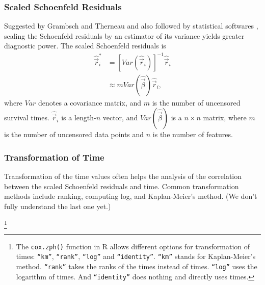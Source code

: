 \subsubsection{Scaled Schoenfeld Residuals}\label{cox:scaled-residual}
Suggested by Grambsch and Therneau \cite{grambsch1994proportional} and also
followed by statistical softwares \cite{testph}, scaling the Schoenfeld
residuals by an estimator of its variance yields greater diagnostic power. The
scaled Schoenfeld residuals is
\begin{eqnarray}
\hat{\vec{r}}^{*}_i &= [\mathit{Var}(\hat{\vec{r}}_i)]^{-1} \hat{\vec{r}}_i\\
&\approx m \mathit{Var}(\hat{\vec{\beta}}) \hat{\vec{r}}_i  ,
\end{eqnarray}
where $\mathit{Var}$ denotes a covariance matrix, and $m$ is the
number of uncensored survival times. $\hat{\vec{r}}_i$ is a length-$n$
vector, and $\mathit{Var}(\hat{\vec{\beta}})$ is a $n\times n$
matrix, where $m$ is the number of uncensored data points and $n$ is
the number of features.

\subsubsection{Transformation of Time}\label{cox:transform}
Transformation of the time values often helps the analysis of the correlation
between the scaled Schoenfeld residuals and time. Common transformation methods
include ranking, computing log, and Kaplan-Meier's method. (We don't fully
understand the last one yet.)

\footnote{The \texttt{cox.zph()} function in R allows different options for
transformation of times: \texttt{``km''}, \texttt{``rank''},
\texttt{``log''} and \texttt{``identity''}.
\texttt{``km''} stands for Kaplan-Meier's method.
\texttt{``rank''} takes the ranks of the times instead of times.
\texttt{``log''} uses the logarithm of times.
And \texttt{``identity''} does nothing and directly uses times.\cite{cox-zph}}


